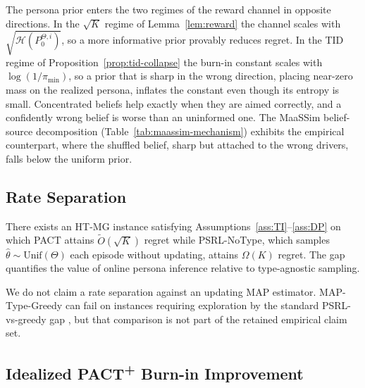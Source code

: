 \begin{remark}
\label{rem:prior-double-edged}
The persona prior enters the two regimes of the reward channel in opposite directions. In the $\sqrt K$ regime of Lemma~\ref{lem:reward} the channel scales with $\sqrt{\mathcal H(P_0^{\Theta,i})}$, so a more informative prior provably reduces regret. In the TID regime of Proposition~\ref{prop:tid-collapse} the burn-in constant scales with $\log(1/\pi_{\min})$, so a prior that is sharp in the wrong direction, placing near-zero mass on the realized persona, inflates the constant even though its entropy is small. Concentrated beliefs help exactly when they are aimed correctly, and a confidently wrong belief is worse than an uninformed one. The MaaSSim belief-source decomposition (Table~\ref{tab:maassim-mechanism}) exhibits the empirical counterpart, where the shuffled belief, sharp but attached to the wrong drivers, falls below the uniform prior.
\end{remark}

\subsection{Rate Separation}
\label{app:rate-separation}
\label{sec:rate-separation}

\begin{theorem}
\label{thm:rate-separation}
There exists an HT-MG instance satisfying Assumptions~\ref{ass:TI}--\ref{ass:DP} on which PACT attains $\tilde O(\sqrt K)$ regret while PSRL-NoType, which samples $\hat\theta\sim\mathrm{Unif}(\Theta)$ each episode without updating, attains $\Omega(K)$ regret. The gap quantifies the value of online persona inference relative to type-agnostic sampling.
\end{theorem}

\begin{remark}[Scope]
\label{rem:rate-sep-scope}
We do not claim a rate separation against an updating MAP estimator. MAP-Type-Greedy can fail on instances requiring exploration by the standard PSRL-vs-greedy gap \citep{osband2013more}, but that comparison is not part of the retained empirical claim set.
\end{remark}

\subsection{Idealized PACT\textsuperscript{+} Burn-in Improvement}
\label{app:pact-plus}

